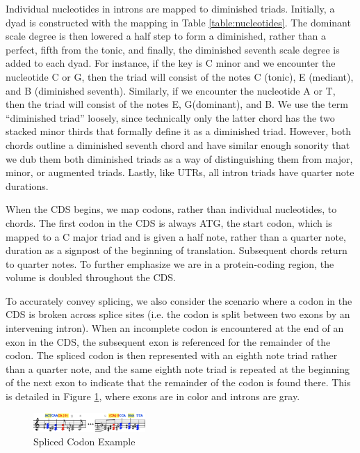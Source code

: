 \documentclass[letterpaper]{article}
\begin{document}
Individual nucleotides in introns are mapped to diminished triads. Initially, a dyad is constructed with the mapping in Table \ref{table:nucleotides}. The dominant scale degree is then lowered a half step to form a diminished, rather than a perfect, fifth from the tonic, and finally, the diminished seventh scale degree is added to each dyad. For instance, if the key is C minor and we encounter the nucleotide C or G, then the triad will consist of the notes C (tonic), E\musFlat\; (mediant), and B\musDoubleFlat\; (diminished seventh). Similarly, if we encounter the nucleotide A or T, then the triad will consist of the notes E\musFlat, G\musFlat (dominant), and B\musDoubleFlat. We use the term “diminished triad” loosely, since technically only the latter chord has the two stacked minor thirds that formally define it as a diminished triad. However, both chords outline a diminished seventh chord and have similar enough sonority that we dub them both diminished triads as a way of distinguishing them from major, minor, or augmented triads. Lastly, like UTRs, all intron triads have quarter note durations.

When the CDS begins, we map codons, rather than individual nucleotides, to chords. The first codon in the CDS is always ATG, the start codon, which is mapped to a C major triad and is given a half note, rather than a quarter note, duration as a signpost of the beginning of translation. Subsequent chords return to quarter notes. To further emphasize we are in a protein-coding region, the volume is doubled throughout the CDS.

To accurately convey splicing, we also consider the scenario where a codon in the CDS is broken across splice sites (i.e. the codon is split between two exons by an intervening intron). When an incomplete codon is encountered at the end of an exon in the CDS, the subsequent exon is referenced for the remainder of the codon. The spliced codon is then represented with an eighth note triad rather than a quarter note, and the same eighth note triad is repeated at the beginning of the next exon to indicate that the remainder of the codon is found there. This is detailed in Figure \ref{fig:splice_site_example}, where exons are in color and introns are gray. 

\begin{figure}[h!]
\centering
\vspace{-3mm}
\includegraphics[width=0.38\textwidth]{images/splice_site_example}
  \caption{Spliced Codon Example}
  \label{fig:splice_site_example}
  \vspace{-3mm}
\end{figure}
\end{document}
